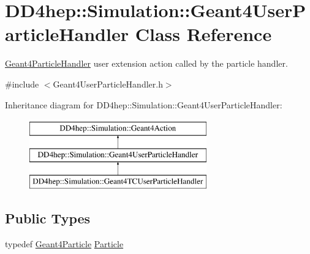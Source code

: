 \hypertarget{class_d_d4hep_1_1_simulation_1_1_geant4_user_particle_handler}{}\section{D\+D4hep\+:\+:Simulation\+:\+:Geant4\+User\+Particle\+Handler Class Reference}
\label{class_d_d4hep_1_1_simulation_1_1_geant4_user_particle_handler}


\hyperlink{class_d_d4hep_1_1_simulation_1_1_geant4_particle_handler}{Geant4\+Particle\+Handler} user extension action called by the particle handler.  




{\ttfamily \#include $<$Geant4\+User\+Particle\+Handler.\+h$>$}

Inheritance diagram for D\+D4hep\+:\+:Simulation\+:\+:Geant4\+User\+Particle\+Handler\+:\begin{figure}[H]
\begin{center}
\leavevmode
\includegraphics[height=3.000000cm]{class_d_d4hep_1_1_simulation_1_1_geant4_user_particle_handler}
\end{center}
\end{figure}
\subsection*{Public Types}
\begin{DoxyCompactItemize}
\item 
typedef \hyperlink{class_d_d4hep_1_1_simulation_1_1_geant4_particle}{Geant4\+Particle} \hyperlink{class_d_d4hep_1_1_simulation_1_1_geant4_user_particle_handler_a0222f326d539ff27c6c446a7a30e8e26}{Particle}
\end{DoxyCompactItemize}
